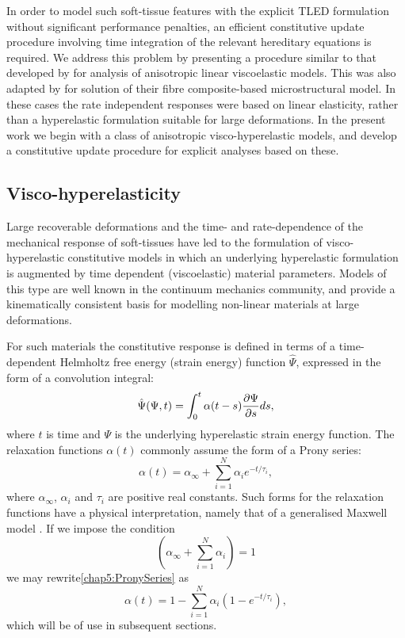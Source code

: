 In order to model such soft-tissue features with the explicit TLED formulation without significant performance penalties, an efficient constitutive update procedure involving time integration of the relevant hereditary equations is required. We address this problem by presenting a procedure similar to that developed by \cite{Poon98} for analysis of anisotropic linear viscoelastic models. This was also adapted by \cite{Taylor07} for solution of their fibre composite-based microstructural model. In these cases the rate independent responses were based on linear elasticity, rather than a hyperelastic formulation suitable for large deformations. In the present work we begin with a class of anisotropic visco-hyperelastic models, and develop a constitutive update procedure for explicit analyses based on these. 
		
	\subsection{Visco-hyperelasticity}
Large recoverable deformations and the time- and rate-dependence of the mechanical response of soft-tissues have led to the formulation of visco-hyperelastic constitutive models in which an underlying hyperelastic formulation is augmented by time dependent (viscoelastic) material parameters. Models of this type are well known in the continuum mechanics community, and provide a kinematically consistent basis for modelling non-linear materials at large deformations.
	
For such materials the constitutive response is defined in terms of a time-dependent Helmholtz free energy (strain energy) function $ \hat{\Psi} $, expressed in the form of a convolution integral:
\begin{equation}
\hat{\Psi} (\Psi ,t) = \int_0^t \alpha (t-s) \dfrac{\partial \Psi}{\partial s} ds,
\end{equation}
where $ t $ is time and $ \Psi $ is the underlying hyperelastic strain energy function. The relaxation functions $ \alpha (t) $ commonly assume the form of a Prony series:
\begin{equation}
\label{chap5:PronySeries}
\alpha (t) = \alpha_{\infty} + \sum_{i=1}^N \alpha_i e^{-t/\tau_i},
\end{equation}
where $ \alpha_{\infty} $, $ \alpha_i $ and $ \tau_i $ are positive real constants. Such forms for the relaxation functions have a physical interpretation, namely that of a generalised Maxwell model \citep{Holzapfel96}. If we impose the condition
\begin{equation}
\left( \alpha_{\infty} + \sum_{i=1}^N \alpha_i \right) = 1
\end{equation}
we may rewrite\eqref{chap5:PronySeries} as
\begin{equation}
\label{chap5:PronySeries2}
\alpha (t) = 1 - \sum_{i=1}^N \alpha_i (1-e^{-t/\tau_i}),
\end{equation}
which will be of use in subsequent sections. 

